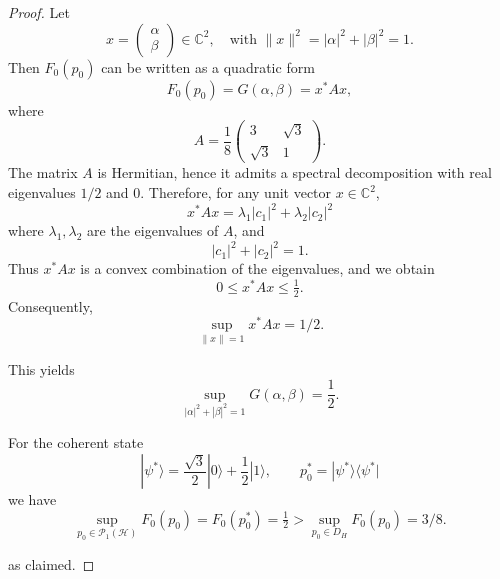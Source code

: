 \documentclass[10pt,a4paper]{amsart}
\begin{document}
\begin{proof}
Let
\[
x =
\begin{pmatrix}
\alpha \\
\beta
\end{pmatrix}
\in \mathbb{C}^2,
\quad \text{with } \|x\|^2 = |\alpha|^2 + |\beta|^2 = 1.
\]
Then \(F_0(p_0)\) can be written as a quadratic form
\[
F_0(p_0)=G(\alpha,\beta) = x^* A x,
\]
where
\[
A =
\frac{1}{8}
\begin{pmatrix}
3 & \sqrt{3} \\
\sqrt{3} & 1
\end{pmatrix}.
\]
The matrix \(A\) is Hermitian, hence it admits a spectral decomposition with real eigenvalues  \(1/2\) and \(0\). Therefore, for any unit vector \(x \in \mathbb{C}^2\),
\[
x^* A x = \lambda_1 |c_1|^2 + \lambda_2 |c_2|^2
\]
where \(\lambda_1,\lambda_2\) are the eigenvalues of \(A\), and
\[
|c_1|^2 + |c_2|^2 = 1.
\]
Thus \(x^* A x\) is a convex combination of the eigenvalues, and we obtain
\[
0
\le x^* A x
\le \tfrac{1}{2}.
\]
Consequently,
\[
\sup_{\|x\|=1} x^* A x = 1/2.
\]

This yields
\[
\sup_{|\alpha|^2 + |\beta|^2 = 1} G(\alpha,\beta) = \frac{1}{2}.
\]

For the coherent state
$$
|\psi^*\rangle
=
\frac{\sqrt{3}}{2}|0\rangle + \frac{1}{2}|1\rangle,
\qquad
p_0^* = |\psi^*\rangle\langle\psi^*|
$$
we have
\[
\sup_{p_0\in\mathcal{P}_1(\mathcal{H})} F_0(p_0)=F_0(p_0^*)
  = \tfrac{1}{2} > \sup_{p_0\in D_H} F_0(p_0) = 3/8.
\]

as claimed.

\end{proof}
\end{document}
